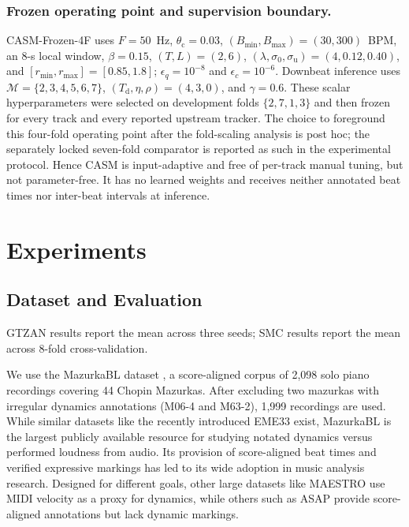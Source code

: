 \documentclass{article}
\begin{document}
\subsubsection{Frozen operating point and supervision boundary.}
CASM-Frozen-4F uses $F=50$~Hz, $\theta_{\mathrm c}=0.03$,
$(B_{\min},B_{\max})=(30,300)$~BPM, an 8-s local window, $\beta=0.15$,
$(T,L)=(2,6)$, $(\lambda,\sigma_0,\sigma_{\mathrm u})=(4,0.12,0.40)$,
and $[r_{\min},r_{\max}]=[0.85,1.8]$; $\epsilon_q=10^{-8}$ and
$\epsilon_c=10^{-6}$.  Downbeat inference uses
$\mathcal M=\{2,3,4,5,6,7\}$, $(T_{\mathrm d},\eta,\rho)=(4,3,0)$, and
$\gamma=0.6$.  These scalar hyperparameters were selected on development folds
$\{2,7,1,3\}$ and then frozen for every track and every reported upstream
tracker.  The choice to foreground this four-fold operating point after the
fold-scaling analysis is post hoc; the separately locked seven-fold comparator
is reported as such in the experimental protocol.  Hence CASM is
input-adaptive and free of per-track manual tuning, but not parameter-free.  It
has no learned weights and receives neither annotated beat times nor
inter-beat intervals at inference.


\section{Experiments}
\label{sec:exp}

\subsection{Dataset and Evaluation}
\label{ssec:data}
GTZAN results report the mean across three seeds; SMC results report the mean across 8-fold cross-validation. 
 
We use the MazurkaBL dataset \cite{kosta2018mazurkabl}, a score-aligned corpus of 2,098 solo piano recordings covering 44 Chopin Mazurkas. After excluding two mazurkas with irregular dynamics annotations (M06-4 and M63-2), 1,999 recordings are used. While similar datasets like the recently introduced EME33 \cite{hung2024eme33} exist, MazurkaBL is the largest publicly available resource for studying notated dynamics versus performed loudness from audio. Its provision of score-aligned beat times and verified expressive markings has led to its wide adoption in music analysis research. Designed for different goals, other large datasets like MAESTRO \cite{hawthorne2019maestro} use MIDI velocity as a proxy for dynamics, while others such as ASAP \cite{foscarin2020asap} provide score-aligned annotations but lack dynamic markings.
\end{document}
